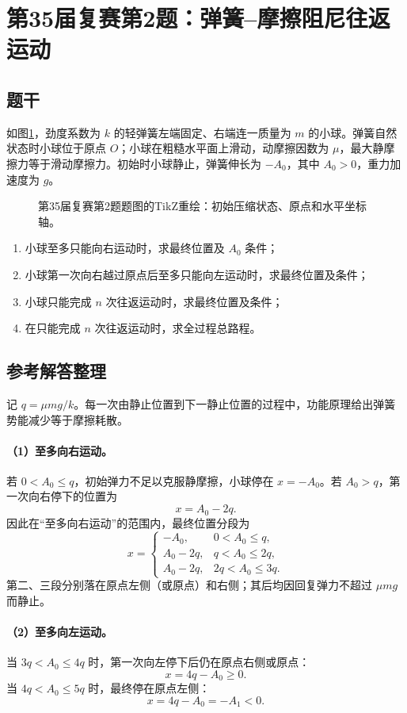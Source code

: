 \section{第35届复赛第2题：弹簧--摩擦阻尼往返运动}
\subsection{题干}
如图\ref{fig:cpho35q02}，劲度系数为 $k$ 的轻弹簧左端固定、右端连一质量为 $m$ 的小球。弹簧自然状态时小球位于原点 $O$；小球在粗糙水平面上滑动，动摩擦因数为 $\mu$，最大静摩擦力等于滑动摩擦力。初始时小球静止，弹簧伸长为 $-A_0$，其中 $A_0>0$，重力加速度为 $g$。
\begin{figure}[htbp]\centering

\caption{第35届复赛第2题题图的TikZ重绘：初始压缩状态、原点和水平坐标轴。}\label{fig:cpho35q02}
\end{figure}
\begin{enumerate}
\item 小球至多只能向右运动时，求最终位置及 $A_0$ 条件；
\item 小球第一次向右越过原点后至多只能向左运动时，求最终位置及条件；
\item 小球只能完成 $n$ 次往返运动时，求最终位置及条件；
\item 在只能完成 $n$ 次往返运动时，求全过程总路程。
\end{enumerate}

\subsection{参考解答整理}
记 $q=\mu mg/k$。每一次由静止位置到下一静止位置的过程中，功能原理给出弹簧势能减少等于摩擦耗散。

\paragraph{（1）至多向右运动。} 若 $0<A_0\leq q$，初始弹力不足以克服静摩擦，小球停在 $x=-A_0$。若 $A_0>q$，第一次向右停下的位置为
\[x=A_0-2q.\]
因此在“至多向右运动”的范围内，最终位置分段为
\[
x=\begin{cases}
-A_0,&0<A_0\leq q,\\
A_0-2q,&q<A_0\leq2q,\\
A_0-2q,&2q<A_0\leq3q.
\end{cases}
\]
第二、三段分别落在原点左侧（或原点）和右侧；其后均因回复弹力不超过 $\mu mg$ 而静止。

\paragraph{（2）至多向左运动。} 当 $3q<A_0\leq4q$ 时，第一次向左停下后仍在原点右侧或原点：
\[x=4q-A_0\geq0.\]
当 $4q<A_0\leq5q$ 时，最终停在原点左侧：
\[x=4q-A_0=-A_1<0.\]

